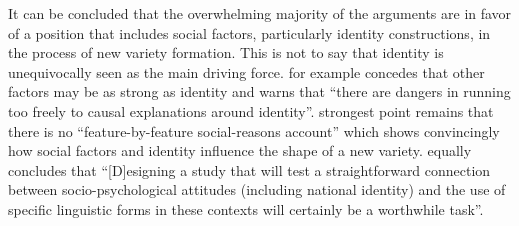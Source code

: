 It can be concluded that the overwhelming majority of the arguments are in favor of a position that includes social factors, particularly identity constructions, in the process of new variety formation. This is not to say that identity is unequivocally seen as the main driving force. \citet[265]{Schneider2008b} for example concedes that other factors may be as strong as identity and \citet[267--268]{Coupland2008} warns that “there are dangers in running too freely to causal explanations around identity”.  strongest point remains that there is no “feature-by-feature social-reasons account” which shows convincingly how social factors and identity influence the shape of a new variety. \citet[266]{Schneider2008b} equally concludes that “[D]esigning a study that will test a straightforward connection between socio-psychological attitudes (including national identity) and the use of specific linguistic forms in these contexts will certainly be a worthwhile task”.

